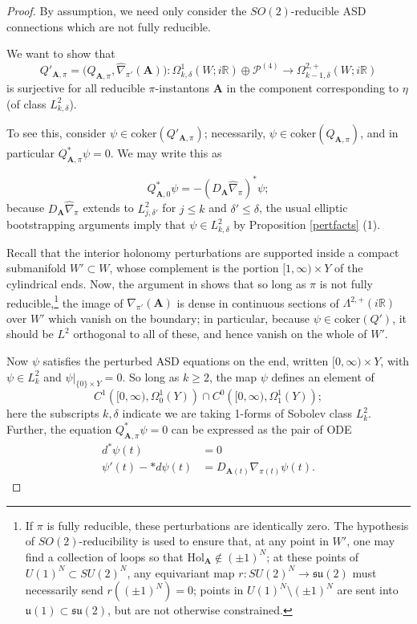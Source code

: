 \documentclass{memo-l}
\theoremstyle{definition}
\theoremstyle{remark}
\numberwithin{section}{chapter}
\numberwithin{equation}{chapter}
\begin{document}
\begin{proof}By assumption, we need only consider the $SO(2)$-reducible ASD connections which are not fully reducible.

We want to show that
$$Q'_{\mathbf{A},\pi} = \big(Q_{\mathbf{A},\pi}, \widehat{\nabla}_{\pi'}(\mathbf{A})\big): \Omega^1_{k,\delta}(W;i\mathbb R) \oplus \mathcal P^{(4)} \to \Omega^{2,+}_{k-1,\delta}(W;i\mathbb R)$$ is surjective for all reducible $\pi$-instantons $\mathbf{A}$ in the component corresponding to $\eta$ (of class $L^2_{k,\delta}$).

To see this, consider $\psi \in \text{coker}(Q'_{\mathbf{A},\pi})$; necessarily, $\psi \in \text{coker}(Q_{\mathbf{A},\pi})$, and in particular $Q^*_{\mathbf{A},\pi}\psi = 0$. We may write this as

$$Q^*_{\mathbf{A},0}\psi = -(D_{\mathbf{A}}\widehat{\nabla}_\pi)^*\psi;$$ because $D_{\mathbf{A}}\widehat{\nabla}_\pi$ extends to $L^2_{j,\delta'}$ for $j \le k$ and $\delta' \le \delta$, the usual elliptic bootstrapping arguments imply that $\psi \in L^2_{k,\delta}$ by Proposition \ref{pertfacts} (1).

Recall that the interior holonomy perturbations are supported inside a compact submanifold $W' \subset W$, whose complement is the portion $[1,\infty) \times Y$ of the cylindrical ends. Now, the argument in \cite[Lemma~3.7]{Kronheimer} shows that so long as $\pi$ is not fully reducible,\footnote{If $\pi$ is fully reducible, these perturbations are identically zero. The hypothesis of $SO(2)$-reducibility is used to ensure that, at any point in $W'$, one may find a collection of loops so that $\text{Hol}_{\mathbf{A}} \not \in (\pm 1)^N$; at these points of $U(1)^N \subset SU(2)^N$, any equivariant map $r: SU(2)^N \to \mathfrak{su}(2)$ must necessarily send $r((\pm 1)^N) = 0$; points in $U(1)^N \setminus (\pm 1)^N$ are sent into $\mathfrak u(1) \subset \mathfrak{su}(2)$, but are not otherwise constrained.} the image of $\widehat{\nabla}_{\pi'}(\mathbf{A})$ is dense in continuous sections of $\Lambda^{2,+}(i\mathbb R)$ over $W'$ which vanish on the boundary; in particular, because $\psi \in \text{coker}(Q')$, it should be $L^2$ orthogonal to all of these, and hence vanish on the whole of $W'$.

Now $\psi$ satisfies the perturbed ASD equations on the end, written $[0, \infty) \times Y$, with $\psi \in L^2_k$ and $\psi\big|_{\{0\} \times Y} = 0$. So long as $k \geq 2$, the map $\psi$ defines an element of
$$C^1\left([0, \infty), \Omega^1_0(Y)\right) \cap C^0\left([0, \infty), \Omega^1_1(Y)\right);$$
here the subscripts $k,\delta$ indicate we are taking 1-forms of Sobolev class $L^2_{k}$. Further, the equation $Q_{\mathbf A, \pi}^* \psi = 0$ can be expressed as the pair of ODE
\begin{align*}
d^*\psi(t) &= 0 \\
\psi'(t) - *d\psi(t) &= D_{\mathbf{A}(t)} \nabla_{\pi(t)} \psi(t).
\end{align*}


\end{proof}
\end{document}
